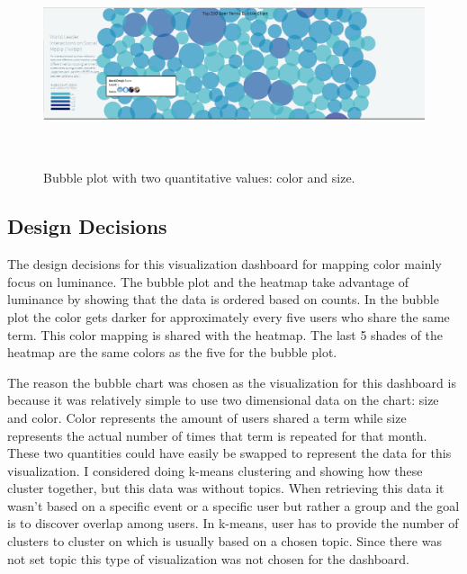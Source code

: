 \documentclass[journal]{vgtc}                %
\begin{document}
\begin{figure}
 \centering
 \includegraphics[height=6cm,width=0.8\linewidth]{imgs/bubble.png}
 \caption{Bubble plot with two quantitative values: color and size.}
 \label{fig:sample-2}
\end{figure}

\subsection{Design Decisions}

The design decisions for this visualization dashboard for mapping color mainly focus on luminance.
The bubble plot and the heatmap take advantage of luminance by showing that the data is ordered based on counts.
In the bubble plot the color gets darker for approximately every five users who share the same term.
This color mapping is shared with the heatmap.
The last 5 shades of the heatmap are the same colors as the five for the bubble plot.

The reason the bubble chart was chosen as the visualization for this dashboard is because it was relatively simple to use two dimensional data on the chart: size and color. 
Color represents the amount of users shared a term while size represents the actual number of times that term is repeated for that month.
These two quantities could have easily be swapped to represent the data for this visualization.
I considered doing k-means clustering and showing how these cluster together, but this data was without topics.
When retrieving this data it wasn't based on a specific event or a specific user but rather a group and the goal is to discover overlap among users. 
In k-means, user has to provide the number of clusters to cluster on which is usually based on a chosen topic.
Since there was not set topic this type of visualization was not chosen for the dashboard.
\end{document}
